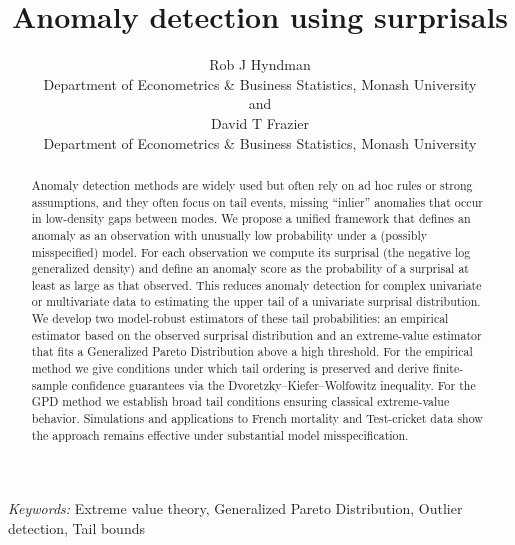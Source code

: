 \documentclass[
  12pt]{article}
\theoremstyle{plain}
\theoremstyle{plain}
\theoremstyle{definition}
\theoremstyle{plain}
\theoremstyle{remark}
\begin{document}
\def\spacingset#1{\renewcommand{\baselinestretch}%
{#1}\small\normalsize} \spacingset{1}



\title{\bf Anomaly detection using surprisals}
\author{
Rob J Hyndman\\
Department of Econometrics \& Business Statistics, Monash University\\
and\\David T Frazier\\
Department of Econometrics \& Business Statistics, Monash University\\
}
\maketitle

\bigskip
\bigskip
\begin{abstract}
Anomaly detection methods are widely used but often rely on ad hoc rules
or strong assumptions, and they often focus on tail events, missing
``inlier'' anomalies that occur in low-density gaps between modes. We
propose a unified framework that defines an anomaly as an observation
with unusually low probability under a (possibly misspecified) model.
For each observation we compute its surprisal (the negative log
generalized density) and define an anomaly score as the probability of a
surprisal at least as large as that observed. This reduces anomaly
detection for complex univariate or multivariate data to estimating the
upper tail of a univariate surprisal distribution. We develop two
model-robust estimators of these tail probabilities: an empirical
estimator based on the observed surprisal distribution and an
extreme-value estimator that fits a Generalized Pareto Distribution
above a high threshold. For the empirical method we give conditions
under which tail ordering is preserved and derive finite-sample
confidence guarantees via the Dvoretzky--Kiefer--Wolfowitz inequality.
For the GPD method we establish broad tail conditions ensuring classical
extreme-value behavior. Simulations and applications to French mortality
and Test-cricket data show the approach remains effective under
substantial model misspecification.
\end{abstract}

\noindent%
{\it Keywords:} Extreme value theory, Generalized Pareto
Distribution, Outlier detection, Tail bounds
\vfill

\newpage
\spacingset{1.9} %
\end{document}
